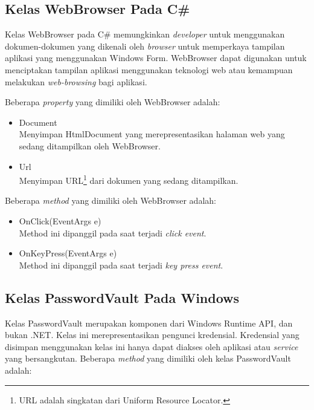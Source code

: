 \subsection{Kelas WebBrowser Pada C\#}
\label{subsec:webbrowser}

Kelas WebBrowser pada C\# memungkinkan \textit{developer} untuk menggunakan dokumen-dokumen yang dikenali oleh \textit{browser} untuk memperkaya tampilan aplikasi yang menggunakan Windows Form\cite{WebBrowser:2016}. WebBrowser dapat digunakan untuk menciptakan tampilan aplikasi menggunakan teknologi web atau kemampuan melakukan \textit{web-browsing} bagi aplikasi.

Beberapa \textit{property} yang dimiliki oleh WebBrowser adalah:

\begin{itemize}
    \item{Document\\Menyimpan HtmlDocument yang merepresentasikan halaman web yang sedang ditampilkan oleh WebBrowser.}
    \item{Url\\Menyimpan URL\footnote{URL adalah singkatan dari Uniform Resource Locator.} dari dokumen yang sedang ditampilkan.}
\end{itemize}

Beberapa \textit{method} yang dimiliki oleh WebBrowser adalah:

\begin{itemize}
    \item{OnClick(EventArgs e)\\Method ini dipanggil pada saat terjadi \textit{click event}.}
    \item{OnKeyPress(EventArgs e)\\Method ini dipanggil pada saat terjadi \textit{key press event}.}
\end{itemize}

\subsection{Kelas PasswordVault Pada Windows}
\label{subsec:passwordvault}

Kelas PasswordVault merupakan komponen dari Windows Runtime API, dan bukan .NET\cite{PasswordVault:2016}. Kelas ini merepresentasikan pengunci kredensial. Kredensial yang disimpan menggunakan kelas ini hanya dapat diakses oleh aplikasi atau \textit{service} yang bersangkutan. Beberapa \textit{method} yang dimiliki oleh kelas PasswordVault adalah:

